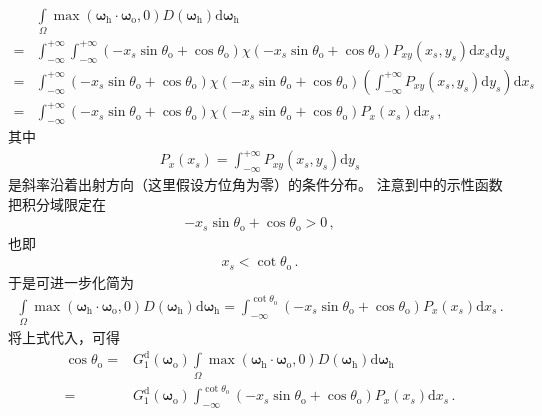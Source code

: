 \begin{align}\label{eq:08-ex01-trans-1d-slope}
      & \int\limits_{\varOmega}\max({\bm\omega}_{\mathrm{h}}\cdot{\bm\omega}_{\mathrm{o}},0)
    D({\bm\omega}_{\mathrm{h}})\mathrm{d}{\bm\omega}_{\mathrm{h}}\nonumber                   \\
    = & \int_{-\infty}^{+\infty}\int_{-\infty}^{+\infty}
    (-x_s\sin\theta_{\mathrm{o}}+\cos\theta_{\mathrm{o}})
    \chi(-x_s\sin\theta_{\mathrm{o}}+\cos\theta_{\mathrm{o}})
    P_{xy}(x_s,y_s)\mathrm{d}x_s\mathrm{d}y_s\nonumber                                       \\
    = & \displaystyle\int_{-\infty}^{+\infty}
    (-x_s\sin\theta_{\mathrm{o}}+\cos\theta_{\mathrm{o}})
    \chi(-x_s\sin\theta_{\mathrm{o}}+\cos\theta_{\mathrm{o}})
    \left(\int_{-\infty}^{+\infty}P_{xy}(x_s,y_s)\mathrm{d}y_s\right)\mathrm{d}x_s\nonumber  \\
    = & \displaystyle\int_{-\infty}^{+\infty}
    (-x_s\sin\theta_{\mathrm{o}}+\cos\theta_{\mathrm{o}})
    \chi(-x_s\sin\theta_{\mathrm{o}}+\cos\theta_{\mathrm{o}})P_x(x_s)\mathrm{d}x_s\, ,
\end{align}
其中
\begin{align}
    P_x(x_s)=\int_{-\infty}^{+\infty}P_{xy}(x_s,y_s)\mathrm{d}y_s
\end{align}
是斜率沿着出射方向（这里假设方位角为零）的条件分布。
注意到中的示性函数把积分域限定在
\begin{align}
    -x_s\sin\theta_{\mathrm{o}}+\cos\theta_{\mathrm{o}}>0\, ,
\end{align}
也即
\begin{align}
    x_s<\cot\theta_{\mathrm{o}}\, .
\end{align}
于是可进一步化简为
\begin{align}
    \int\limits_{\varOmega}\max({\bm\omega}_{\mathrm{h}}\cdot{\bm\omega}_{\mathrm{o}},0)
    D({\bm\omega}_{\mathrm{h}})\mathrm{d}{\bm\omega}_{\mathrm{h}}
    =\int_{-\infty}^{\cot\theta_{\mathrm{o}}}
    (-x_s\sin\theta_{\mathrm{o}}+\cos\theta_{\mathrm{o}})P_x(x_s)\mathrm{d}x_s\, .
\end{align}
将上式代入，可得
\begin{align}
    \cos\theta_{\mathrm{o}}
    = & G_1^{\mathrm{d}}({\bm\omega}_{\mathrm{o}})
    \int\limits_{\varOmega}\max({\bm\omega}_{\mathrm{h}}\cdot{\bm\omega}_{\mathrm{o}},0)
    D({\bm\omega}_{\mathrm{h}})\mathrm{d}{\bm\omega}_{\mathrm{h}}\nonumber \\
    = & G_1^{\mathrm{d}}({\bm\omega}_{\mathrm{o}})
    \int_{-\infty}^{\cot\theta_{\mathrm{o}}}
    (-x_s\sin\theta_{\mathrm{o}}+\cos\theta_{\mathrm{o}})P_x(x_s)\mathrm{d}x_s\, .
\end{align}
